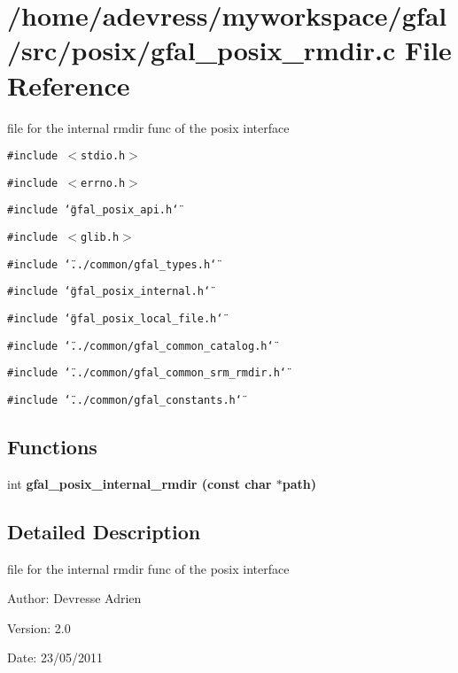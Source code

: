 \section{/home/adevress/myworkspace/gfal/src/posix/gfal\_\-posix\_\-rmdir.c File Reference}
\label{gfal__posix__rmdir_8c}
file for the internal rmdir func of the posix interface 

{\tt \#include $<$stdio.h$>$}\par
{\tt \#include $<$errno.h$>$}\par
{\tt \#include \char`\"{}gfal\_\-posix\_\-api.h\char`\"{}}\par
{\tt \#include $<$glib.h$>$}\par
{\tt \#include \char`\"{}../common/gfal\_\-types.h\char`\"{}}\par
{\tt \#include \char`\"{}gfal\_\-posix\_\-internal.h\char`\"{}}\par
{\tt \#include \char`\"{}gfal\_\-posix\_\-local\_\-file.h\char`\"{}}\par
{\tt \#include \char`\"{}../common/gfal\_\-common\_\-catalog.h\char`\"{}}\par
{\tt \#include \char`\"{}../common/gfal\_\-common\_\-srm\_\-rmdir.h\char`\"{}}\par
{\tt \#include \char`\"{}../common/gfal\_\-constants.h\char`\"{}}\par
\subsection*{Functions}
\begin{CompactItemize}
\item 
int \bf{gfal\_\-posix\_\-internal\_\-rmdir} (const char $\ast$path)
\end{CompactItemize}


\subsection{Detailed Description}
file for the internal rmdir func of the posix interface 

\begin{Desc}
\item[Author:]Devresse Adrien \end{Desc}
\begin{Desc}
\item[Version:]2.0 \end{Desc}
\begin{Desc}
\item[Date:]23/05/2011 \end{Desc}


